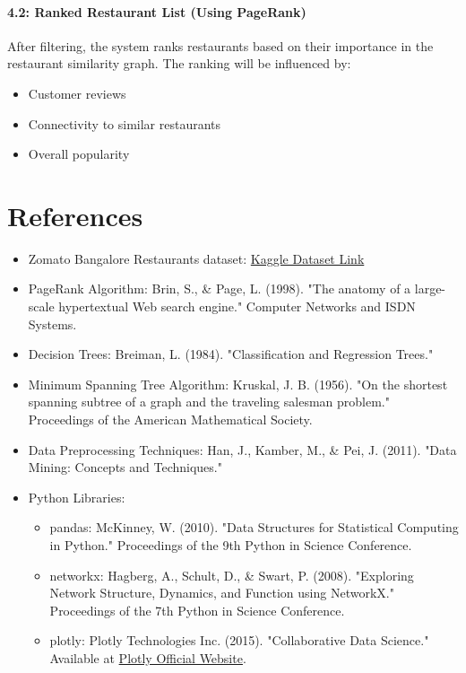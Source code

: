 \documentclass[fontsize=11pt]{article}
\begin{document}
\paragraph*{4.2: Ranked Restaurant List (Using PageRank)}
After filtering, the system ranks restaurants based on their importance in the restaurant similarity graph. The ranking will be influenced by:
\begin{itemize}
    \item Customer reviews
    \item Connectivity to similar restaurants
    \item Overall popularity
\end{itemize}

\section*{References}
\begin{itemize}
    \item Zomato Bangalore Restaurants dataset: \href{https://www.kaggle.com/datasets/himanshupoddar/zomato-bangalore-restaurants}{Kaggle Dataset Link}
    \item PageRank Algorithm: Brin, S., \& Page, L. (1998). "The anatomy of a large-scale hypertextual Web search engine." Computer Networks and ISDN Systems.
    \item Decision Trees: Breiman, L. (1984). "Classification and Regression Trees."
    \item Minimum Spanning Tree Algorithm: Kruskal, J. B. (1956). "On the shortest spanning subtree of a graph and the traveling salesman problem." Proceedings of the American Mathematical Society.
    \item Data Preprocessing Techniques: Han, J., Kamber, M., \& Pei, J. (2011). "Data Mining: Concepts and Techniques."
    \item Python Libraries:
    \begin{itemize}
        \item pandas: McKinney, W. (2010). "Data Structures for Statistical Computing in Python." Proceedings of the 9th Python in Science Conference.
        \item networkx: Hagberg, A., Schult, D., \& Swart, P. (2008). "Exploring Network Structure, Dynamics, and Function using NetworkX." Proceedings of the 7th Python in Science Conference.
        \item plotly: Plotly Technologies Inc. (2015). "Collaborative Data Science." Available at \href{https://plotly.com}{Plotly Official Website}.
    \end{itemize}
\end{itemize}
\end{document}
